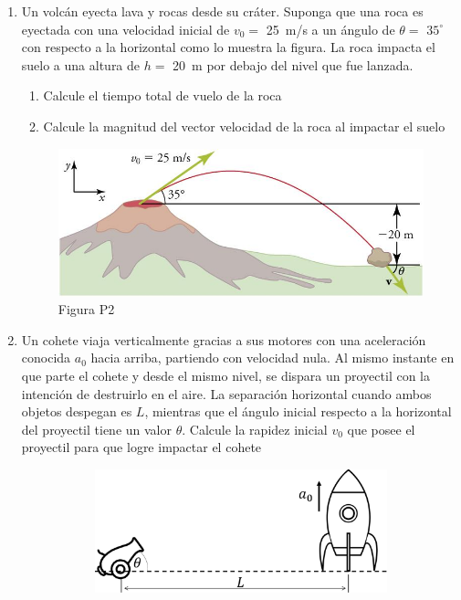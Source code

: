 \documentclass[letterpaper,11pt]{article}
\begin{document}
\begin{enumerate}
\item Un volcán eyecta lava y rocas desde su cráter. Suponga que una roca es eyectada con una velocidad inicial de $v_0 = $ \SI{25}{\m/\s} a un ángulo de $\theta = $ $35^{\circ}$ con respecto a la horizontal como lo muestra la figura. La roca impacta el suelo a una altura de $h = $ \SI{20}{\m} por debajo del nivel que fue lanzada.
    \begin{enumerate}
        \item Calcule el tiempo total de vuelo de la roca
        
        \item Calcule la magnitud del vector velocidad de la roca al impactar el suelo
    \end{enumerate}

\begin{figure}[H]
    \centering
    \includegraphics[width=0.5\linewidth]{2021-1/Imagenes/aux2/volcan.jpg}
    \caption*{Figura P2}
\end{figure}

\item Un cohete viaja verticalmente gracias a sus motores con una aceleración conocida $a_0$ hacia arriba, partiendo con velocidad nula. Al mismo instante en que parte el cohete y desde el mismo nivel, se dispara un proyectil con la intención de destruirlo en el aire. La separación horizontal cuando ambos objetos despegan es $L$, mientras que el ángulo inicial respecto a la horizontal del proyectil tiene un valor $\theta$. Calcule la rapidez inicial $v_0$ que posee el proyectil para que logre impactar el cohete

\begin{figure}[H]
    \centering
    \begin{subfigure}[t]{0.4\textwidth}
        \centering
        \includegraphics[width=0.8\linewidth]{2021-1/Imagenes/aux2/cohete-cannon.pdf}
    \end{subfigure}
\end{figure}


\end{enumerate}
\end{document}
